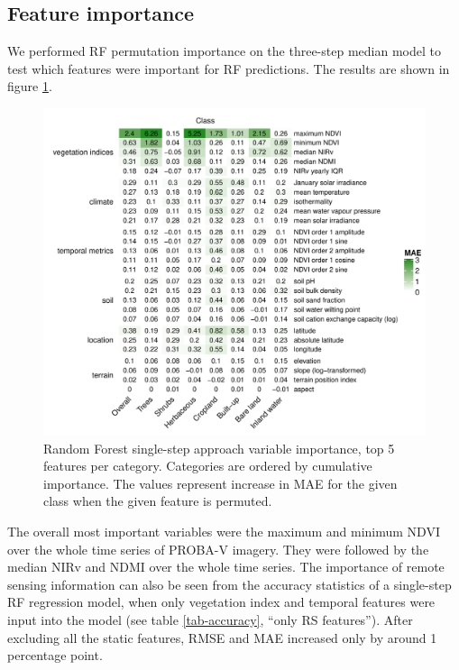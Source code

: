 \documentclass[review,authoryear,3p]{elsarticle}
\begin{document}
\subsection{Feature importance}

We performed \Gls{RF} permutation importance on the three-step median model to test which features were important for \gls{RF} predictions.
The results are shown in figure \ref{fig-varimp}.

\begin{figure}
    \centering
    \includegraphics[width=14cm]{article/article-figures/heatmaps/2020-11-06-varimp-heatmap-top5}
    \caption{Random Forest single-step approach variable importance, top 5 features per category. Categories are ordered by cumulative importance. The values represent increase in MAE for the given class when the given feature is permuted.}
    \label{fig-varimp}
\end{figure}

The overall most important variables were the maximum and minimum \gls{NDVI} over the whole time series of PROBA-V imagery.
They were followed by the median \gls{NIRv} and \gls{NDMI} over the whole time series.
The importance of remote sensing information can also be seen from the accuracy statistics of a single-step \gls{RF} regression model, when only vegetation index and temporal features were input into the model (see table \ref{tab-accuracy}, ``only RS features'').
After excluding all the static features, \gls{RMSE} and \gls{MAE} increased only by around 1 percentage point.
\end{document}
